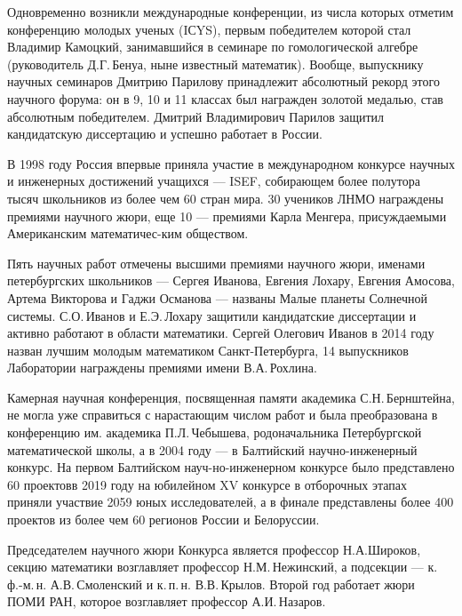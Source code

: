 \ms\abz Одновременно возникли международные конференции, из числа которых отметим конференцию молодых ученых (IСYS),  первым победителем которой стал Владимир Камоцкий, занимавшийся в семинаре по гомологической алгебре (руководитель Д.Г.\,Бенуа, ныне известный математик). Вообще, выпускнику научных семинаров Дмитрию Парилову принадлежит абсолютный рекорд этого научного форума: он в 9, 10 и 11 классах был награжден золотой медалью, став абсолютным победителем. Дмитрий Владимирович Парилов защитил кандидатскую диссертацию и успешно работает в России. 

\ms\abz В 1998 году Россия впервые приняла участие в международном конкурсе научных и инженерных достижений учащихся — ISEF, собирающем более полутора тысяч школьников из более чем 60 стран мира. 30 учеников ЛНМО награждены премиями научного жюри, еще 10 — премиями Карла Менгера, присуждаемыми Американским математичес-\linebreak ким обществом.

\ms\abz Пять научных работ отмечены высшими премиями научного жюри, именами петербургских школьников — Сергея Иванова, Евгения Лохару, Евгения Амосова, Артема Викторова и Гаджи Османова — названы Малые планеты Солнечной системы. С.О.\,Иванов и Е.Э.\,Лохару защитили кандидатские диссертации и активно работают в области математики. Сергей Олегович Иванов в 2014 году назван лучшим молодым математиком Санкт-Петербурга, 14 выпускников Лаборатории награждены премиями имени В.А.\,Рохлина.

\ms\abz Камерная научная конференция, посвященная памяти академика С.Н.\,Бернштейна, не могла уже справиться с нарастающим числом работ и была преобразована в конференцию им. академика П.Л.\,Чебышева, родоначальника Петербургской математической школы, а в 2004 году — в Балтийский научно-инженерный конкурс. На первом Балтийском науч-\linebreak но-инженерном конкурсе было представлено 60 проектов\scolon в 2019 году на юбилейном XV конкурсе в отборочных этапах приняли участвие 2059 юных исследователей, а в финале представлены более 400 проектов из более чем 60 регионов России и Белоруссии.

\ms\abz Председателем научного жюри Конкурса является профессор Н.А.\linebreak Широков, секцию математики возглавляет профессор Н.М.\,Нежинский, а подсекции — к.\,ф.-м.\,н. А.В.\,Смоленский и к.\,п.\,н. В.В.\,Крылов. Второй год работает жюри ПОМИ РАН, которое возглавляет профессор А.И.\,Назаров.

